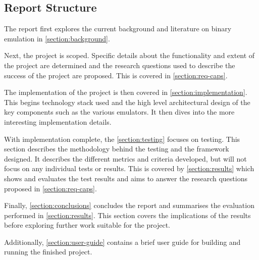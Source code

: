 \subsection{Report Structure}

The report first explores the current background and literature on binary emulation in \autoref{section:background}.

Next, the project is scoped. Specific details about the functionality and extent of the project are determined and the research questions used to describe the success of the project are proposed. This is covered in \autoref{section:req-caps}.

The implementation of the project is then covered in \autoref{section:implementation}. This begins technology stack used and the high level architectural design of the key components such as the various emulators. It then dives into the more interesting implementation details.

With implementation complete, the \autoref{section:testing} focuses on testing. This section describes the methodology behind the testing and the framework designed. It describes the different metrics and criteria developed, but will not focus on any individual tests or results. This is covered by \autoref{section:results} which shows and evaluates the test results and aims to answer the research questions proposed in \autoref{section:req-caps}.

Finally, \autoref{section:conclusions} concludes the report and summarises the evaluation performed in \autoref{section:results}. This section covers the implications of the results before exploring further work suitable for the project.

Additionally, \autoref{section:user-guide} contains a brief user guide for building and running the finished project.